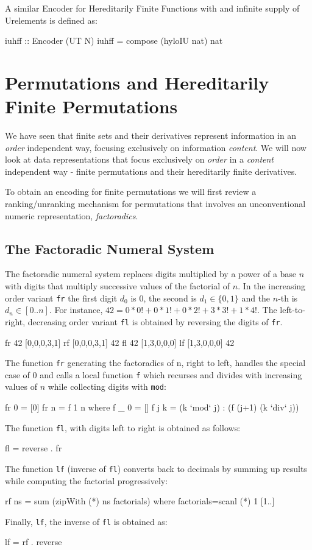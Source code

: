 \documentclass[]{INCLUDES/llncs}
\begin{document}
A similar Encoder for Hereditarily Finite Functions with and infinite
supply of Urelements is defined as:
\begin{code}
iuhff :: Encoder (UT N)
iuhff = compose (hyloIU nat) nat
\end{code}

\section{Permutations and Hereditarily Finite Permutations} \label{perm}
We have seen that finite sets and their derivatives represent
information in an {\em order} independent way, focusing exclusively
on information {\em content}. 
We will now look at data representations that focus exclusively on {\em order}
in a {\em content} independent way - finite permutations and their hereditarily
finite derivatives.

To obtain an encoding for finite permutations
we will first review a ranking/unranking mechanism for permutations that
involves an unconventional numeric representation, {\em factoradics}.

\subsection{The Factoradic Numeral System}
The factoradic numeral system \cite{knuth_art_1997-1} replaces digits
multiplied by a power of a base $n$ with digits that multiply successive values
of the factorial of $n$. In the increasing order variant {\tt fr} the first
digit $d_0$ is 0, the second is $d_1 \in \{0,1\}$ and the $n$-th is $d_n \in
[0..n]$. For instance, $42=0*0!+0*1!+0*2!+3*3!+1*4!$.
The left-to-right, decreasing order variant {\tt fl} 
is obtained by reversing the digits of {\tt fr}.
\begin{codex}
fr 42
  [0,0,0,3,1]
rf [0,0,0,3,1]
  42
fl 42
  [1,3,0,0,0]
lf [1,3,0,0,0]
  42
\end{codex}
\noindent The function {\tt fr} 
generating the factoradics of n, right to left,
handles the special case of $0$ and
calls a local function {\tt f} which recurses and divides with increasing values
of $n$ while collecting digits with {\tt mod}:
\begin{code}
fr 0 = [0]
fr n = f 1 n where
   f _ 0 = []
   f j k = (k `mod` j) : 
           (f (j+1) (k `div` j))
\end{code}
The function {\tt fl}, with digits left to right is obtained as follows:
\begin{code}
fl = reverse . fr
\end{code}
The function {\tt lf} (inverse of {\tt fl}) converts back to decimals by
summing up results while computing the factorial progressively:
\begin{code}
rf ns = sum (zipWith (*) ns factorials) where
  factorials=scanl (*) 1 [1..]
\end{code}
Finally, {\tt lf}, the inverse of {\tt fl} is obtained as:
\begin{code}
lf = rf . reverse
\end{code}
\end{document}
